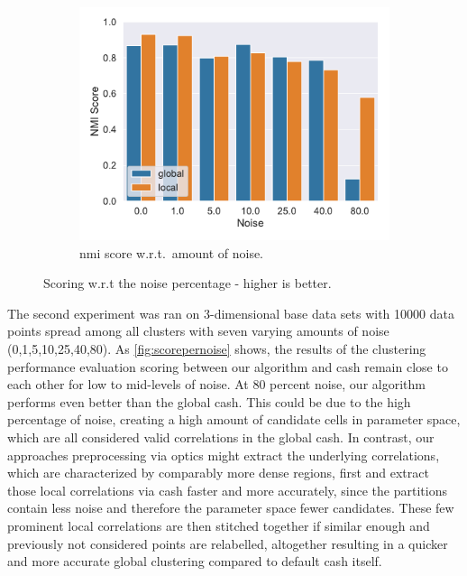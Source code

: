 \begin{figure}[h]
\begin{subfigure}[t]{.5\textwidth}
      \includegraphics[width=\textwidth]{new_evaluation/per_noise/Best_NMI_3D_O10000_pnoise_bar.pdf}
      \caption{\gls{nmi} score w.r.t.\ amount of noise.}
      \label{fig:nmiperpts}
    \end{subfigure}    
    \caption{Scoring w.r.t the noise percentage - higher is better.}
    \label{fig:scorepernoise}
\end{figure}
The second experiment was ran on 3-dimensional base data sets with 10000 data points spread among all clusters with seven varying amounts of noise (0,1,5,10,25,40,80).
As \autoref{fig:scorepernoise} shows, the results of the clustering performance evaluation scoring between our algorithm and \gls{cash} remain close to each other for low to mid-levels of noise. At 80 percent noise, our algorithm performs even better than the global \gls{cash}. This could be due to the high percentage of noise, creating a high amount of candidate cells in parameter space, which are all considered valid correlations in the global \gls{cash}. In contrast, our approaches preprocessing via \gls{optics} might extract the underlying correlations, which are characterized by comparably more dense regions, first and extract those local correlations via \gls{cash} faster and more accurately, since the partitions contain less noise and therefore the parameter space fewer candidates. These few prominent local correlations are then stitched together if similar enough and previously not considered points are relabelled, altogether resulting in a quicker and more accurate global clustering compared to default \gls{cash} itself.

